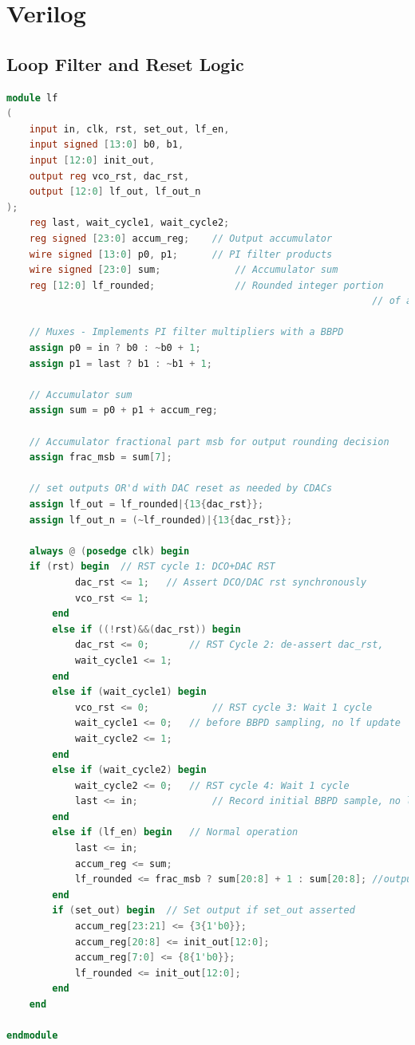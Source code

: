 	\appendix
	\section{Verilog}\label{sec:verilog}

		\subsection{Loop Filter and Reset Logic} \label{sec:lf_verilog}

	\begin{lstlisting}[language={Verilog}, caption={Loop filter hardware description.}, label={sim_code2}]
module lf
(
	input in, clk, rst, set_out, lf_en,
	input signed [13:0] b0, b1,
	input [12:0] init_out,
	output reg vco_rst, dac_rst,
	output [12:0] lf_out, lf_out_n
);
	reg last, wait_cycle1, wait_cycle2;
	reg signed [23:0] accum_reg;	// Output accumulator
	wire signed [13:0] p0, p1;		// PI filter products
	wire signed [23:0] sum;				// Accumulator sum
	reg [12:0] lf_rounded;				// Rounded integer portion
																// of accumulator for output

	// Muxes - Implements PI filter multipliers with a BBPD
	assign p0 = in ? b0 : ~b0 + 1; 
	assign p1 = last ? b1 : ~b1 + 1;

	// Accumulator sum
	assign sum = p0 + p1 + accum_reg;

	// Accumulator fractional part msb for output rounding decision
	assign frac_msb = sum[7];

	// set outputs OR'd with DAC reset as needed by CDACs
	assign lf_out = lf_rounded|{13{dac_rst}};
	assign lf_out_n = (~lf_rounded)|{13{dac_rst}};

	always @ (posedge clk) begin
    if (rst) begin 	// RST cycle 1: DCO+DAC RST
			dac_rst <= 1; 	// Assert DCO/DAC rst synchronously
			vco_rst <= 1; 
		end
		else if ((!rst)&&(dac_rst)) begin  
			dac_rst <= 0;		// RST Cycle 2: de-assert dac_rst,		
			wait_cycle1 <= 1;
		end
		else if (wait_cycle1) begin
			vco_rst <= 0;			// RST cycle 3: Wait 1 cycle
			wait_cycle1 <= 0;	// before BBPD sampling, no lf update
			wait_cycle2 <= 1;		
		end
		else if (wait_cycle2) begin
			wait_cycle2 <= 0;	// RST cycle 4: Wait 1 cycle
			last <= in;				// Record initial BBPD sample, no lf update
		end
		else if (lf_en) begin 	// Normal operation
			last <= in;
			accum_reg <= sum;
			lf_rounded <= frac_msb ? sum[20:8] + 1 : sum[20:8]; //output rounding
		end
		if (set_out) begin 	// Set output if set_out asserted
			accum_reg[23:21] <= {3{1'b0}};
			accum_reg[20:8] <= init_out[12:0];
			accum_reg[7:0] <= {8{1'b0}};
			lf_rounded <= init_out[12:0];	
		end
	end

endmodule
	    \end{lstlisting}

